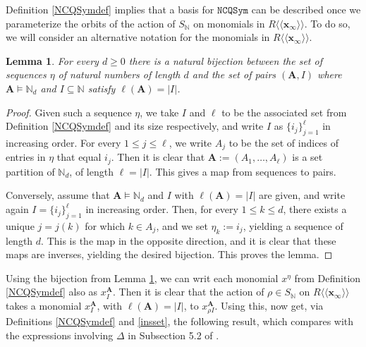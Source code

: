 \documentclass{article}
\newtheorem{lem}[thm]{Lemma}
\theoremstyle{definition}
\begin{document}
Definition \ref{NCQSymdef} implies that a basis for $\mathtt{NCQSym}$ can be described once we parameterize the orbits of the action of $S_{\mathbb{N}}$ on monomials in $R\langle\langle\mathbf{x}_{\infty}\rangle\rangle$. To do so, we will consider an alternative notation for the monomials in $R\langle\langle\mathbf{x}_{\infty}\rangle\rangle$.
\begin{lem}
For every $d\geq0$ there is a natural bijection between the set of sequences $\eta$ of natural numbers of length $d$ and the set of pairs $(\mathbf{A},I)$ where $\mathbf{A}\vDash\mathbb{N}_{d}$ and $I\subseteq\mathbb{N}$ satisfy $\ell(\mathbf{A})=|I|$. \label{altmon}
\end{lem}

\begin{proof}
Given such a sequence $\eta$, we take $I$ and $\ell$ to be the associated set from Definition \ref{NCQSymdef} and its size respectively, and write $I$ as $\{i_{j}\}_{j=1}^{\ell}$ in increasing order. For every $1 \leq j\leq\ell$, we write $A_{j}$ to be the set of indices of entries in $\eta$ that equal $i_{j}$. Then it is clear that $\mathbf{A}:=(A_{1},\ldots,A_{\ell})$ is a set partition of $\mathbb{N}_{d}$, of length $\ell=|I|$. This gives a map from sequences to pairs.

Conversely, assume that $\mathbf{A}\vDash\mathbb{N}_{d}$ and $I$ with $\ell(\mathbf{A})=|I|$ are given, and write again $I=\{i_{j}\}_{j=1}^{\ell}$ in increasing order. Then, for every $1 \leq k \leq d$, there exists a unique $j=j(k)$ for which $k \in A_{j}$, and we set $\eta_{k}:=i_{j}$, yielding a sequence of length $d$. This is the map in the opposite direction, and it is clear that these maps are inverses, yielding the desired bijection. This proves the lemma.
\end{proof}
Using the bijection from Lemma \ref{altmon}, we can writ each monomial $x^{\eta}$ from Definition \ref{NCQSymdef} also as $x_{I}^{\mathbf{A}}$. Then it is clear that the action of $\rho \in S_{\mathbb{N}}$ on $R\langle\langle\mathbf{x}_{\infty}\rangle\rangle$ takes a monomial $x_{I}^{\mathbf{A}}$, with $\ell(\mathbf{A})=|I|$, to $x_{\rho I}^{\mathbf{A}}$. Using this, now get, via Definitions \ref{NCQSymdef} and \ref{insset}, the following result, which compares with the expressions involving $\Delta$ in Subsection 5.2 of \cite{[BZ]}.
\end{document}
